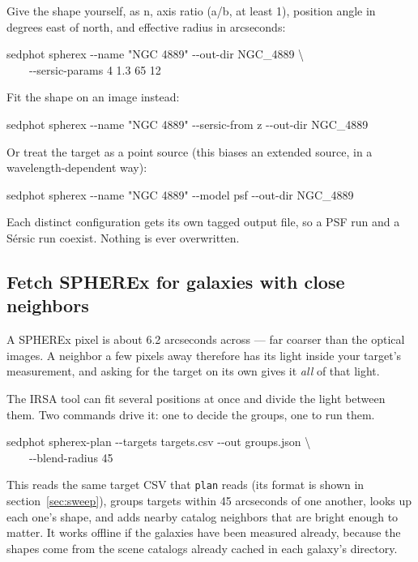\documentclass[11pt]{article}
\newcommand{\cmdline}[1]{\begin{cmd}\ttfamily #1\end{cmd}}
\begin{document}
Give the shape yourself, as n, axis ratio (a/b, at least 1), position
angle in degrees east of north, and effective radius in arcseconds:

\begin{cmd}\ttfamily\frenchspacing
sedphot spherex -{}-name "NGC 4889" -{}-out-dir NGC\_4889 \textbackslash\\
\mbox{}~~~~-{}-sersic-params 4 1.3 65 12
\end{cmd}

Fit the shape on an image instead:

\cmdline{sedphot spherex -{}-name "NGC 4889" -{}-sersic-from z -{}-out-dir NGC\_4889}

Or treat the target as a point source (this biases an extended source, in
a wavelength-dependent way):

\cmdline{sedphot spherex -{}-name "NGC 4889" -{}-model psf -{}-out-dir NGC\_4889}

Each distinct configuration gets its own tagged output file, so a PSF run
and a S\'ersic run coexist. Nothing is ever overwritten.

\subsection{Fetch SPHEREx for galaxies with close neighbors}
\label{sec:joint}

A SPHEREx pixel is about 6.2 arcseconds across --- far coarser than the
optical images. A neighbor a few pixels away therefore has its light inside
your target's measurement, and asking for the target on its own gives it
\emph{all} of that light.

The IRSA tool can fit several positions at once and divide the light between
them. Two commands drive it: one to decide the groups, one to run them.

\begin{cmd}\ttfamily\frenchspacing
sedphot spherex-plan -{}-targets targets.csv -{}-out groups.json \textbackslash\\
\mbox{}~~~~-{}-blend-radius 45
\end{cmd}

This reads the same target CSV that \texttt{plan} reads (its format is
shown in section~\ref{sec:sweep}), groups targets
within 45 arcseconds of one another, looks up each one's shape, and adds
nearby catalog neighbors that are bright enough to matter. It works offline
if the galaxies have been measured already, because the shapes come from the
scene catalogs already cached in each galaxy's directory.
\end{document}
